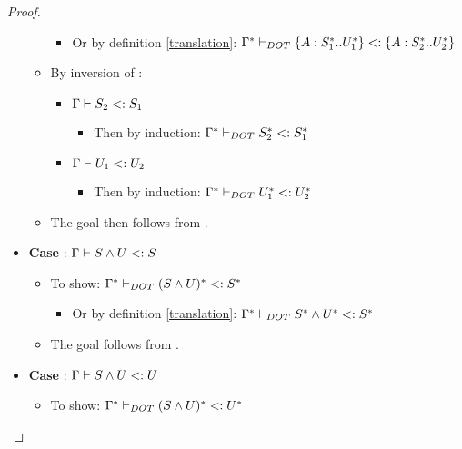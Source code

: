 \begin{proof}
\begin{itemize}
\begin{itemize}
\begin{itemize}
                \item Or by definition \ref{translation}:
                    $\Gamma^{*} \vdash_{DOT} \{A : S_1^{*} .. U_1^{*}\} <: \{A : S_2^{*} .. U_2^{*}\}$
            \end{itemize}
            \item By inversion of :
            \begin{itemize}
                \item $\Gamma \vdash S_2 <: S_1$
                \begin{itemize}
                    \item Then by induction:
                        $\Gamma^{*} \vdash_{DOT} S_2^{*} <: S_1^{*}$
                \end{itemize}
                \item $\Gamma \vdash U_1 <: U_2$
                \begin{itemize}
                    \item Then by induction:
                        $\Gamma^{*} \vdash_{DOT} U_1^{*} <: U_2^{*}$
                \end{itemize}
            \end{itemize}
            \item The goal then follows from .
        \end{itemize}
        \item \textbf{Case} : $\Gamma \vdash S \wedge U <: S$
        \begin{itemize}
            \item To show:
                $\Gamma^{*} \vdash_{DOT} (S \wedge U)^{*} <: S^{*}$
            \begin{itemize}
                \item Or by definition \ref{translation}: $\Gamma^{*} \vdash_{DOT} S^{*} \wedge U^{*} <: S^{*}$
            \end{itemize}
            \item The goal follows from .
        \end{itemize}
        \item \textbf{Case} : $\Gamma \vdash S \wedge U <: U$
        \begin{itemize}
            \item To show:
                $\Gamma^{*} \vdash_{DOT} (S \wedge U)^{*} <: U^{*}$
            \begin{itemize}

\end{itemize}
\end{itemize}
\end{itemize}
\end{proof}

